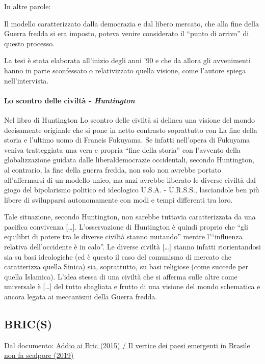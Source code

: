 \documentclass{article}
\begin{document}
In altre parole:

Il modello caratterizzato dalla democrazia e dal libero mercato, che alla fine della Guerra
fredda si era imposto, poteva venire considerato il “punto di arrivo” di questo processo.

La tesi è stata elaborata all’inizio degli anni ’90 e che da allora gli avvenimenti hanno in
parte sconfessato o relativizzato quella visione, come l’autore spiega nell’intervista. 

\paragraph{Lo scontro delle civiltà - \textit{Huntington}} \phantom{}

Nel libro di Huntington Lo scontro delle civiltà si delinea una visione del mondo decisamente
originale che si pone in netto contrasto soprattutto con La fine della storia e l'ultimo uomo
di Francis Fukuyama. Se infatti nell'opera di Fukuyama veniva tratteggiata una vera e propria 
``fine della storia'' con l'avvento della globalizzazione guidata dalle liberaldemocrazie 
occidentali, secondo Huntington, al contrario, la fine della guerra fredda, non solo non avrebbe
portato all'affermarsi di un modello unico, ma anzi avrebbe liberato le diverse civiltà dal
giogo del bipolarismo politico ed ideologico U.S.A. - U.R.S.S., lasciandole ben più libere di
svilupparsi autonomamente con modi e tempi differenti tra loro.

Tale situazione, secondo Huntington, non sarebbe tuttavia caratterizzata da una pacifica
convivenza […]. L'osservazione di Huntington è quindi proprio che ``gli equilibri di potere tra
le diverse civiltà stanno mutando'' mentre l'``influenza relativa dell'occidente è in calo''.
Le diverse civiltà […] stanno infatti riorientandosi sia su basi ideologiche (ed è questo il
caso del comunismo di mercato che caratterizza quella Sinica) sia, soprattutto, su basi 
religiose (come succede per quella Islamica). L'idea stessa di una civiltà che si afferma sulle
altre come universale è […] del tutto sbagliata e frutto di una visione del mondo schematica e 
ancora legata ai meccanismi della Guerra fredda.

\subsection{BRIC(S)}
Dal documento: \href{https://github.com/matteofrongillo/passerella/blob/main/Geografia/media/Internazionale-BRICS-entrambi.pdf?raw=true}
{Addio ai Bric (2015) / Il vertice dei paesi emergenti in Brasile non fa scalpore (2019)}
\end{document}
